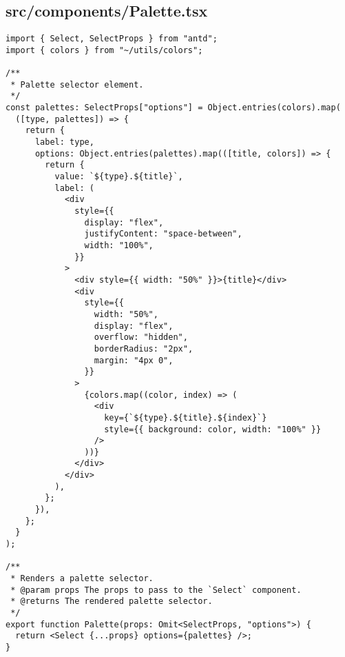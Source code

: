 \subsection{src/components/Palette.tsx}
\begin{verbatim}
import { Select, SelectProps } from "antd";
import { colors } from "~/utils/colors";

/**
 * Palette selector element.
 */
const palettes: SelectProps["options"] = Object.entries(colors).map(
  ([type, palettes]) => {
    return {
      label: type,
      options: Object.entries(palettes).map(([title, colors]) => {
        return {
          value: `${type}.${title}`,
          label: (
            <div
              style={{
                display: "flex",
                justifyContent: "space-between",
                width: "100%",
              }}
            >
              <div style={{ width: "50%" }}>{title}</div>
              <div
                style={{
                  width: "50%",
                  display: "flex",
                  overflow: "hidden",
                  borderRadius: "2px",
                  margin: "4px 0",
                }}
              >
                {colors.map((color, index) => (
                  <div
                    key={`${type}.${title}.${index}`}
                    style={{ background: color, width: "100%" }}
                  />
                ))}
              </div>
            </div>
          ),
        };
      }),
    };
  }
);

/**
 * Renders a palette selector.
 * @param props The props to pass to the `Select` component.
 * @returns The rendered palette selector.
 */
export function Palette(props: Omit<SelectProps, "options">) {
  return <Select {...props} options={palettes} />;
}

\end{verbatim}
